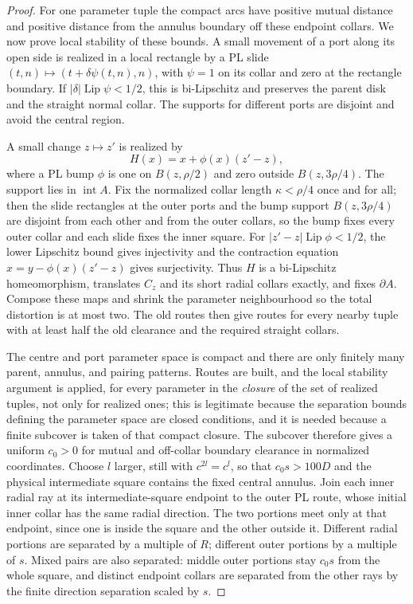 \documentclass[11pt,a4paper]{article}
\theoremstyle{remark}
\begin{document}
\begin{proof}
For one parameter tuple the compact arcs have positive mutual distance
and positive distance from the annulus boundary off these endpoint
collars.  We now prove local stability of these bounds.  A small movement
of a port along its open side is realized in a local rectangle by a PL
slide $(t,n)\mapsto(t+\delta\psi(t,n),n)$, with $\psi=1$ on its
collar and zero at the rectangle boundary.  If
$|\delta|\operatorname{Lip}\psi<1/2$, this is bi-Lipschitz and
preserves the parent disk and the straight normal collar.  The supports
for different ports are disjoint and avoid the central region.

A small change $z\mapsto z'$ is realized by
\[
 H(x)=x+\phi(x)(z'-z),
\]
where a PL bump $\phi$ is one on $B(z,\rho/2)$ and zero outside
$B(z,3\rho/4)$.  The support lies in $\operatorname{int}A$.  Fix the
normalized collar length $\kappa<\rho/4$ once and for all; then the slide
rectangles at the outer ports and the bump support $B(z,3\rho/4)$ are
disjoint from each other and from the outer collars, so the bump fixes
every outer collar and each slide fixes the inner square.
For $|z'-z|\operatorname{Lip}\phi<1/2$, the lower Lipschitz bound
gives injectivity and the contraction equation
$x=y-\phi(x)(z'-z)$ gives surjectivity.  Thus $H$ is a bi-Lipschitz
homeomorphism, translates $C_z$ and its short radial collars exactly,
and fixes $\partial A$.  Compose these maps and shrink the parameter
neighbourhood so the total distortion is at most two.  The old routes
then give routes for every nearby tuple with at least half the old
clearance and the required straight collars.

The centre and port parameter space is compact and there are only
finitely many parent, annulus, and pairing patterns.  Routes are built,
and the local stability argument is applied, for every parameter in the
\emph{closure} of the set of realized tuples, not only for realized ones;
this is legitimate because the separation bounds defining the parameter
space are closed conditions, and it is needed because a finite subcover
is taken of that compact closure.  The subcover therefore gives a uniform
$c_0>0$ for mutual and off-collar boundary clearance in normalized
coordinates.  Choose $l$ larger, still with
$c^{2l}=c^l$, so that $c_0s>100D$ and the physical intermediate square
contains the fixed central annulus.  Join each inner radial ray at its
intermediate-square endpoint to the outer PL route, whose initial
inner collar has the same radial direction.  The two portions meet
only at that endpoint, since one is inside the square and the other
outside it.  Different radial portions are separated by a multiple of
$R$; different outer portions by a multiple of $s$.  Mixed pairs are
also separated: middle outer portions stay $c_0s$ from the whole square,
and distinct endpoint collars are separated from the other rays by the
finite direction separation scaled by $s$.


\end{proof}
\end{document}
